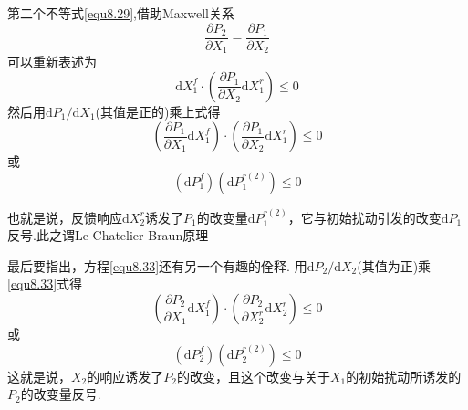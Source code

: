 第二个不等式\eqref{equ8.29},借助Maxwell关系
\begin{equation}
\label{equ8.32}
\frac{\partial P_2}{\partial X_1}=\frac{\partial P_1}{\partial X_2}
\end{equation}
可以重新表述为
\begin{equation}
\label{equ8.33}
\text{d}X_1^f\cdot\left(\frac{\partial P_1}{\partial X_2}\text{d}X_1^r \right)\leq 0 
\end{equation}
然后用$\text{d}P_1 /\text{d}X_1$(其值是正的)乘上式得
\begin{equation}
\label{equ8.34}
\left(\frac{\partial P_1}{\partial X_1}\text{d}X_1^f\right)\cdot \left(\frac{\partial P_1}{\partial X_2}\text{d}X_1^r\right)\leq 0
\end{equation}
或
\begin{equation}
\label{equ8.35}
(\text{d}P_1^f )(\text{d}P_1^{r(2)} )\leq 0
\end{equation}

也就是说，反馈响应$\text{d}X_2^r$诱发了$P_1$的改变量$\text{d}P_1^{r(2)} $，它与初始扰动引发的改变$\text{d}P_1 $反号.此之谓Le Chatelier-Braun原理

最后要指出，方程\eqref{equ8.33}还有另一个有趣的佺释. 用$\text{d}P_2/\text{d}X_2$(其值为正)乘\eqref{equ8.33}式得
\begin{equation}
\label{equ8.36}
\left(\frac{\partial P_2}{\partial X_1}\text{d}X_1^f\right)\cdot \left(\frac{\partial P_2}{\partial X_2^r}\text{d}X_2^r\right)\leq 0
\end{equation}
或
\begin{equation}
(\text{d}P_2^f )(\text{d}P_2^{r(2)} )\leq 0
\end{equation}
这就是说，$X_2$的响应诱发了$P_2$的改变，且这个改变与关于$X_1$的初始扰动所诱发的$P_2$的改变量反号.